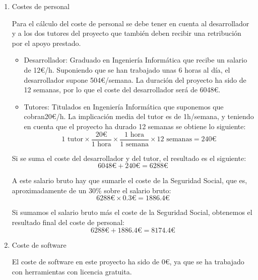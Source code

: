 \begin{enumerate}

\item Costes de personal

Para el cálculo del coste de personal se debe tener en cuenta al desarrollador y a los dos tutores del proyecto que también deben recibir una retribución por el apoyo prestado.

\begin{itemize}
\item Desarrollador: Graduado en Ingeniería Informática que recibe un salario de 12€/h. Suponiendo que se han trabajado unas 6 horas al día, el desarrollador supone 504€/semana. La duración del proyecto ha sido de 12 semanas, por lo que el coste del desarrollador será de 6048€.
\item Tutores: Titulados en Ingeniería Informática que suponemos que cobran20€/h. La implicación media del tutor es de 1h/semana, y teniendo en cuenta que el proyecto ha durado 12 semanas se obtiene lo siguiente:
\begin{equation*}
1 \text{ tutor} \times \frac{20\text{€}}{1\text{ hora}} \times \frac{1\text{ hora}}{1\text{ semana}} \times 12\text{ semanas} = 240\text{€}
\end{equation*}

\end{itemize}

Si se suma el coste del desarrollador y del tutor, el resultado es el siguiente:
\begin{equation*}
    6048\text{€} + 240\text{€} = 6288\text{€}
\end{equation*}

A este salario bruto hay que sumarle el coste de la Seguridad Social, que es, aproximadamente de un 30\% sobre el salario bruto:
\begin{equation*}
6288\text{€} \times 0.3\text{€} = 1886.4\text{€}
\end{equation*}

Si sumamos el salario bruto más el coste de la Seguridad Social, obtenemos el resultado final del coste de personal:
\begin{equation*}
6288\text{€} + 1886.4\text{€} = 8174.4\text{€}
\end{equation*}

\item Coste de software

El coste de software en este proyecto ha sido de 0€, ya que se ha trabajado con herramientas con licencia gratuita.


\end{enumerate}

